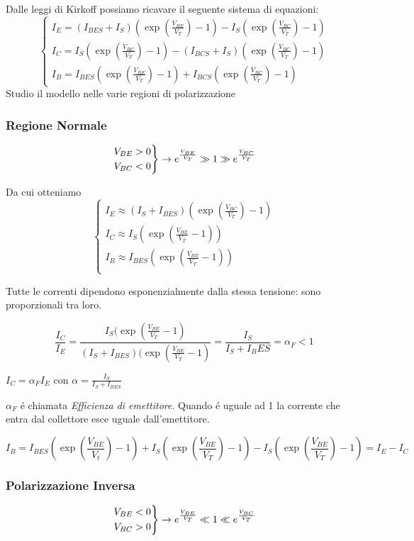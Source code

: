\documentclass{article}
\begin{document}
Dalle leggi di Kirkoff possiamo ricavare il seguente sistema di equazioni:
\[
    \begin{cases}
        I_E = (I_{BES} + I_S) (\exp(\frac{V_{BE}}{V_T}) - 1) - I_S ( \exp(\frac{V_{BC}}{V_T}) -1 )\\
        I_C = I_S ( \exp(\frac{V_{BC}}{V_T}) -1 ) - (I_{BCS} + I_S) (\exp(\frac{V_{BC}}{V_T}) - 1)\\
        I_B = I_{BES} (\exp(\frac{V_{BE}}{V_T}) - 1) + I_{BCS} (\exp(\frac{V_{BC}}{V_T}) -1 )
    \end{cases}
\]
Studio il modello nelle varie regioni di polarizzazione
\subsubsection{Regione Normale}
\[
    \begin{rcases}
        V_{BE} > 0\\
        V_{BC} < 0
\end{rcases} \rightarrow e^{\frac{V_{BE}}{V_T}} \gg 1 \gg e^{\frac{V_{BC}}{V_T}}
\]

Da cui otteniamo
\[
    \begin{cases}
        I_E \approx (I_S + I_{BES}) (\exp(\frac{V_{BC}}{V_T}) -1) \\
        I_C \approx I_S (\exp(\frac{V_{BE}}{V_T} -1 )) \\
        I_B \approx I_{BES} ( \exp(\frac{V_{BE}}{V_T} -1 ))\\
    \end{cases}
\]

Tutte le correnti dipendono esponenzialmente dalla stessa tensione: sono proporzionali tra loro.

\[ \frac{I_C}{I_E} = \frac{I_S (\exp(\frac{V_{BE}}{V_T} -1 )}{(I_S + I_{BES})(\exp(\frac{V_{BE}}{V_T} -1)} = \frac{I_S}{I_S+I_BES} = \alpha_F < 1 \]

$I_C = \alpha_F I_E$ con $\alpha = \frac{I_S}{I_S + I_{BES}}$

$\alpha_F$ \'e chiamata \textit{Efficienza di emettitore}. Quando \'e uguale ad 1 la corrente che entra dal collettore esce uguale dall'emettitore.

\[ I_B = I_{BES}(\exp(\frac{V_{BE}}{V_t}) -1) + I_S (\exp(\frac{V_{BE}}{V_T}) -1) - I_S (\exp(\frac{V_{BE}}{V_T}) -1) = I_E - I_C \]

\subsubsection{Polarizzazione Inversa}
\[
    \begin{rcases}
        V_{BE} < 0\\
        V_{BC} > 0
    \end{rcases} \rightarrow
    e^{\frac{V_{BE}}{V_T}} \ll 1 \ll e^{\frac{V_{BC}}{V_T}}
\]
\end{document}
